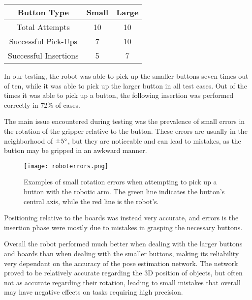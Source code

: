 \begin{table}
    \begin{center}
        \begin{tabular}{|c|cc|}
            \hline
            Button Type & Small & Large \\
            \hline
            Total Attempts & 10 & 10 \\
            \hline
            Successful Pick-Ups & 7 & 10 \\
            \hline
            Successful Insertions & 5 & 7 \\
            \hline

        \end{tabular}
    \end{center}
\end{table}

In our testing, the robot was able to pick up the smaller buttons seven times out of ten, while it was able to pick up the larger button in all test cases. Out of the times it was able to pick up a button, the following insertion was performed correctly in 72\% of cases.

The main issue encountered during testing was the prevalence of small errors in the rotation of the gripper relative to the button. These errors are usually in the neighborhood of $\pm5\degree$, but they are noticeable and can lead to mistakes, as the button may be gripped in an awkward manner.

\begin{figure}[ht]
    \texttt{[image: roboterrors.png]}
    \caption{Examples of small rotation errors when attempting to pick up a button with the robotic arm. The green line indicates the button's central axis, while the red line is the robot's.}
\end{figure}

Positioning relative to the boards was instead very accurate, and errors is the insertion phase were mostly due to mistakes in grasping the necessary buttons.

Overall the robot performed much better when dealing with the larger buttons and boards than when dealing with the smaller buttons, making its reliability very dependant on the accuracy of the pose estimation network. The network proved to be relatively accurate regarding the 3D position of objects, but often not as accurate regarding their rotation, leading to small mistakes that overall may have negative effects on tasks requiring high precision.
